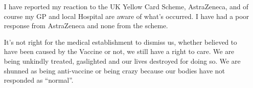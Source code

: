 I have reported my reaction to the UK Yellow Card Scheme, AstraZeneca, and of
course my GP and local Hospital are aware of what’s occurred. I have had a poor
response from AstraZeneca and none from the scheme.

It’s not right for the medical establishment to dismiss us, whether believed to
have been caused by the Vaccine or not, we still have a right to care. We are
being unkindly treated, gaslighted and our lives destroyed for doing so. We are
shunned as being anti-vaccine or being crazy because our bodies have not
responded as “normal”.
